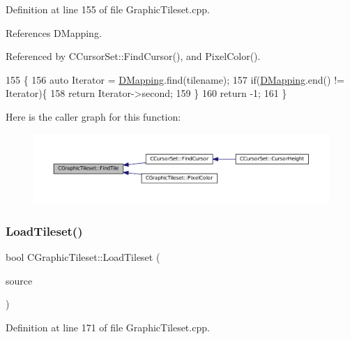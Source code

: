 Definition at line 155 of file Graphic\+Tileset.\+cpp.



References D\+Mapping.



Referenced by C\+Cursor\+Set\+::\+Find\+Cursor(), and Pixel\+Color().


\begin{DoxyCode}
155                                                             \{
156     \textcolor{keyword}{auto} Iterator = \hyperlink{classCGraphicTileset_a17cd13f68f77ea4976b59b37b10e914b}{DMapping}.find(tilename);
157     \textcolor{keywordflow}{if}(\hyperlink{classCGraphicTileset_a17cd13f68f77ea4976b59b37b10e914b}{DMapping}.end() != Iterator)\{
158         \textcolor{keywordflow}{return} Iterator->second;
159     \}
160     \textcolor{keywordflow}{return} -1;
161 \}
\end{DoxyCode}
Here is the caller graph for this function\+:\nopagebreak
\begin{figure}[H]
\begin{center}
\leavevmode
\includegraphics[width=350pt]{classCGraphicTileset_ab8f2c2b2f2095b17d53c3dc475d5685c_icgraph}
\end{center}
\end{figure}
\hypertarget{classCGraphicTileset_a7d47754f26f03958be28a064f54eef1d}{}\label{classCGraphicTileset_a7d47754f26f03958be28a064f54eef1d} 
\subsubsection{\texorpdfstring{Load\+Tileset()}{LoadTileset()}}
{\footnotesize\ttfamily bool C\+Graphic\+Tileset\+::\+Load\+Tileset (\begin{DoxyParamCaption}\item[{std\+::shared\+\_\+ptr$<$ \hyperlink{classCDataSource}{C\+Data\+Source} $>$}]{source }\end{DoxyParamCaption})}



Definition at line 171 of file Graphic\+Tileset.\+cpp.



